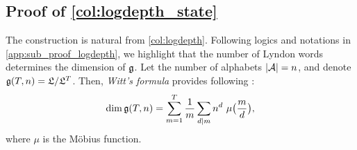 \subsection{Proof of \cref{col:logdepth_state}}
\label{app:sub_proof_logdepth_state}
The construction is natural from \cref{col:logdepth}.
Following logics and notations in \cref{app:sub_proof_logdepth},
we highlight that the number of Lyndon words determines the dimension of $\mathfrak{g}$.
Let the number of alphabets $|\mathcal{A}| = n$,
and denote $\mathfrak{g}(T,n) = \mathfrak{L} / \mathfrak{L}^T$.
Then, \emph{Witt's formula} provides following \cite{magnus1966combinatorial, bouallegue2010primitive}:
\begin{equation*}
    \dim \mathfrak{g}(T,n) = \sum_{m=1}^T \frac{1}{m} \sum_{d \mid m} n^d \ \mu\bigl(\frac{m}{d} \bigr),
\end{equation*}
where $\mu$ is the M\"obius function.